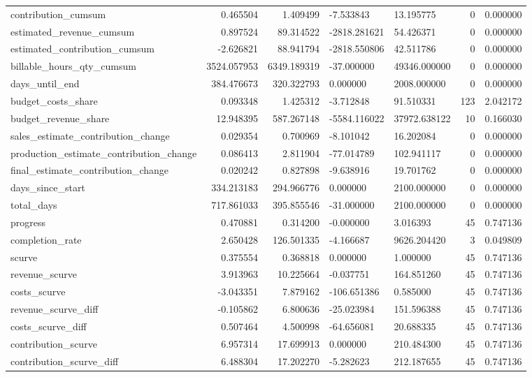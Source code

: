 \begin{landscape}
\begin{longtable}[h!]{lrrllrr}
contribution_cumsum & 0.465504 & 1.409499 & -7.533843 & 13.195775 & 0 & 0.000000 \\
estimated_revenue_cumsum & 0.897524 & 89.314522 & -2818.281621 & 54.426371 & 0 & 0.000000 \\
estimated_contribution_cumsum & -2.626821 & 88.941794 & -2818.550806 & 42.511786 & 0 & 0.000000 \\
billable_hours_qty_cumsum & 3524.057953 & 6349.189319 & -37.000000 & 49346.000000 & 0 & 0.000000 \\
days_until_end & 384.476673 & 320.322793 & 0.000000 & 2008.000000 & 0 & 0.000000 \\
budget_costs_share & 0.093348 & 1.425312 & -3.712848 & 91.510331 & 123 & 2.042172 \\
budget_revenue_share & 12.948395 & 587.267148 & -5584.116022 & 37972.638122 & 10 & 0.166030 \\
sales_estimate_contribution_change & 0.029354 & 0.700969 & -8.101042 & 16.202084 & 0 & 0.000000 \\
production_estimate_contribution_change & 0.086413 & 2.811904 & -77.014789 & 102.941117 & 0 & 0.000000 \\
final_estimate_contribution_change & 0.020242 & 0.827898 & -9.638916 & 19.701762 & 0 & 0.000000 \\
days_since_start & 334.213183 & 294.966776 & 0.000000 & 2100.000000 & 0 & 0.000000 \\
total_days & 717.861033 & 395.855546 & -31.000000 & 2100.000000 & 0 & 0.000000 \\
progress & 0.470881 & 0.314200 & -0.000000 & 3.016393 & 45 & 0.747136 \\
completion_rate & 2.650428 & 126.501335 & -4.166687 & 9626.204420 & 3 & 0.049809 \\
scurve & 0.375554 & 0.368818 & 0.000000 & 1.000000 & 45 & 0.747136 \\
revenue_scurve & 3.913963 & 10.225664 & -0.037751 & 164.851260 & 45 & 0.747136 \\
costs_scurve & -3.043351 & 7.879162 & -106.651386 & 0.585000 & 45 & 0.747136 \\
revenue_scurve_diff & -0.105862 & 6.800636 & -25.023984 & 151.596388 & 45 & 0.747136 \\
costs_scurve_diff & 0.507464 & 4.500998 & -64.656081 & 20.688335 & 45 & 0.747136 \\
contribution_scurve & 6.957314 & 17.699913 & 0.000000 & 210.484300 & 45 & 0.747136 \\
contribution_scurve_diff & 6.488304 & 17.202270 & -5.282623 & 212.187655 & 45 & 0.747136 \\

\end{longtable}
\end{landscape}
